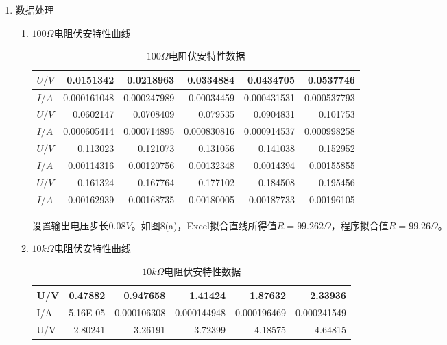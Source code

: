 \documentclass[UTF8]{article}
\begin{document}
\begin{enumerate}
\begin{figure}[H]
    \end{figure}
    \item 数据处理
    \begin{enumerate}
        \item $100\Omega$电阻伏安特性曲线
        \begin{table}[H]
          \centering
          \caption{$100\Omega$电阻伏安特性数据}
            \begin{tabular}{|l|r|r|r|r|r|}\hline
            $U/V$    & 0.0151342 & 0.0218963 & 0.0334884 & 0.0434705 & 0.0537746 \\\hline
            $I/A$    & 0.000161048 & 0.000247989 & 0.00034459 & 0.000431531 & 0.000537793 \\\hline
            $U/V$    & 0.0602147 & 0.0708409 & 0.079535 & 0.0904831 & 0.101753 \\\hline
            $I/A$    & 0.000605414 & 0.000714895 & 0.000830816 & 0.000914537 & 0.000998258 \\\hline
            $U/V$    & 0.113023 & 0.121073 & 0.131056 & 0.141038 & 0.152952 \\\hline
            $I/A$    & 0.00114316 & 0.00120756 & 0.00132348 & 0.0014394 & 0.00155855 \\\hline
            $U/V$    & 0.161324 & 0.167764 & 0.177102 & 0.184508 & 0.195456 \\\hline
            $I/A$    & 0.00162939 & 0.00168735 & 0.00180005 & 0.00187733 & 0.00196105 \\\hline
            \end{tabular}%
          \label{tab:100Omega}%
        \end{table}%
        设置输出电压步长$0.08V$。如图8(a)，Excel拟合直线所得值$R=99.262\Omega$，程序拟合值$R=99.26\Omega$。
        \item $10k\Omega$电阻伏安特性曲线
        \begin{table}[H]
          \centering
          \caption{$10k\Omega$电阻伏安特性数据}
            \begin{tabular}{|l|r|r|r|r|r|}\hline
            U/V    & 0.47882 & 0.947658 & 1.41424 & 1.87632 & 2.33936 \\\hline
            I/A    & 5.16E-05 & 0.000106308 & 0.000144948 & 0.000196469 & 0.000241549 \\\hline
            U/V    & 2.80241 & 3.26191 & 3.72399 & 4.18575 & 4.64815 \\\hline

\end{tabular}
\end{table}
\end{enumerate}
\end{enumerate}
\end{document}
